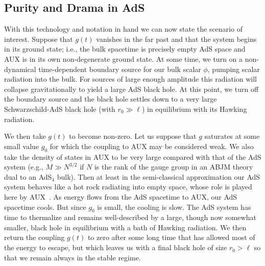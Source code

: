\documentclass[12pt]{article}
\begin{document}
{\subsection{Purity and Drama in AdS}


With this technology and notation in hand we can now state the scenario of interest.  Suppose that $g(t)$ vanishes in the far past and that the system begins in its ground state; i.e., the bulk spacetime is precisely empty AdS space and AUX is in its own non-degenerate ground state.  At some time, we turn on a non-dynamical time-dependent boundary source for our bulk scalar $\phi$, pumping scalar radiation into the bulk.  For sources of large enough amplitude this radiation will collapse gravitationally to yield a large AdS black hole.  At this point, we turn off the boundary source and the black hole settles down to a very large Schwarzschild-AdS black hole (with $r_0 \gg \ell$) in equilibrium with its Hawking radiation.

 We then take $g(t)$ to become non-zero.  Let us suppose that $g$ saturates at some small value $g_0$ for which the coupling to AUX may be considered weak.  We also take the density of states in AUX to be very large compared with that of the AdS system (e.g., $M \gg N^{3/2}$ if $N$ is the rank of the gauge group in an ABJM theory dual to an AdS${}_4$ bulk).  Then at least in the semi-classical approximation our AdS system behaves like a hot rock radiating into empty space, whose role is played here by AUX~\cite{Rocha:2008fe}.  As energy flows from the AdS spacetime to AUX, our AdS spacetime cools.  But since $g_0$ is small, the cooling is slow.  The AdS system has time to thermalize and remains well-described by a large, though now {somewhat} smaller, black hole in equilibrium with a bath of Hawking radiation.   We then return the coupling $g(t)$ to zero after some long time that has allowed most of the energy to escape, but which leaves us with a final black hole of size $r_0 > \ell$ so that we remain always in the stable regime.

}
\end{document}
